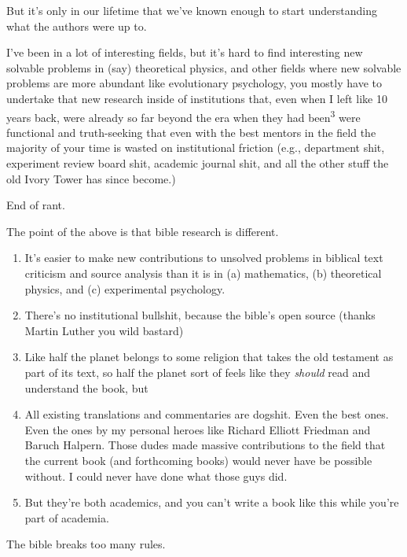 But it's only in our lifetime that we've known enough to start understanding what the authors were up to.

I've been in a lot of interesting fields, but it's hard to find interesting new solvable problems in (say) theoretical physics, and other fields where new solvable problems are more abundant like evolutionary psychology, you mostly have to undertake that new research inside of institutions that, even when I left like 10 years back, were already so far beyond the era when they had been\textsuperscript{3} were functional and truth-seeking that even with the best mentors in the field the majority of your time is wasted on institutional friction (e.g., department shit, experiment review board shit, academic journal shit, and all the other stuff the old Ivory Tower has since become.)

End of rant.

The point of the above is that bible research is different.

\begin{enumerate}

\item It's easier to make new contributions to unsolved problems in biblical text criticism and source analysis than it is in (a) mathematics, (b) theoretical physics, and (c) experimental psychology.

\item There's no institutional bullshit, because the bible's open source (thanks Martin Luther you wild bastard)

\item Like half the planet belongs to some religion that takes the old testament as part of its text, so half the planet sort of feels like they \emph{should} read and understand the book, but

\item All existing translations and commentaries are dogshit. Even the best ones. Even the ones by my personal heroes like Richard Elliott Friedman and Baruch Halpern. Those dudes made massive contributions to the field that the current book (and forthcoming books) would never have be possible without. I could never have done what those guys did.

\item But they're both academics, and you can't write a book like this while you're part of academia.

\end{enumerate}

The bible breaks too many rules.

